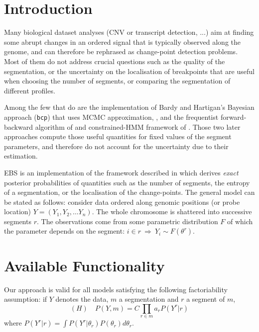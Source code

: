 \documentclass{bioinfo}
\begin{document}
\begin{methods}
\section{Introduction}

Many biological dataset analyses (CNV or transcript
  detection, ...) aim at finding some abrupt changes in an ordered signal that
  is typically observed along the genome, and 
can therefore be rephrased as change-point detection
  problems. Most of them do not address
crucial questions such as the quality of the segmentation, or the
uncertainty on the localisation of breakpoints that are useful when
choosing the number of segments, or comparing the segmentation of
different profiles.

Among the few that do are the implementation of Bardy and Hartigan's
Bayesian approach (\texttt{bcp}) that uses MCMC approximation,
\citep{barry_hartigan, bcp_package}, and the frequentist
forward-backward algorithm of \cite{guedon_2008} and constrained-HMM
framework of \cite{Luong_HMM_2012}. Those two later approaches compute
those useful quantities for fixed values of the segment
parameters, and therefore do not account for the uncertainty due
  to their estimation.

EBS is an implementation of the framework described in
\cite{rigaill_exact_2011} which derives \textit{exact} posterior
probabilities of quantities such as the number of segments, the
entropy of a segmentation, or the localisation of the change-points.
The general model can be stated as
  follows: consider data ordered along genomic positions (or probe
  location) $Y = (Y_1, Y_2, \dots Y_n)$. The whole chromosome is
  shattered into successive segments $r$. The observations come from
  some parametric distribution $F$ of which the parameter depends on the
  segment: $i \in r \: \Rightarrow \: Y_i
  \sim F(\theta^r)$.


\section{Available Functionality}
Our approach is valid for all models satisfying the following factoriability
assumption: if $Y$ denotes the data, $m$ a segmentation and $r$ a
segment of $m$,
\begin{equation}
 (H)\quad P(Y,m) = C \prod_{r\in m} a_r P(Y^r|r) \label{factoriability}
\end{equation}
where $P(Y^r|r) =\int P(Y^r|\theta_r)P(\theta_r)d\theta_r $.


\end{methods}
\end{document}
